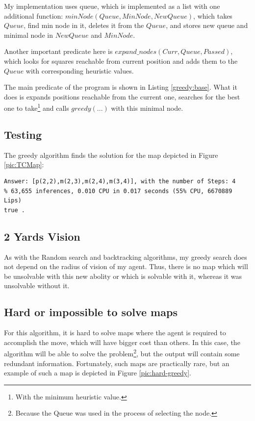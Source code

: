 \documentclass[a4apper,11pt]{article}
\begin{document}
My implementation uses queue, which is implemented as a list with one additional function: $minNode(Queue, MinNode, NewQueue)$, which takes $Queue$, find min node in it, deletes it from the $Queue$, and stores new queue and minimal node in $NewQueue$ and $MinNode$. 

Another important predicate here is $expand\_nodes(Curr, Queue, Passed)$, which looks for squares reachable from current position and adds them to the $Queue$ with corresponding heuristic values.

The main predicate of the program is shown in Listing \ref{greedy:base}. What it does is expands positions reachable from the current one, searches for the best one to take\footnote{With the minimum heuristic value.} and calls $greedy(...)$ with this minimal node.


\subsection{Testing}
The greedy algorithm finds the solution for the map depicted in Figure \ref{pic:TCMap}:
\begin{lstlisting}
Answer: [p(2,2),m(2,3),m(2,4),m(3,4)], with the number of Steps: 4
% 63,655 inferences, 0.010 CPU in 0.017 seconds (55% CPU, 6670889 Lips)
true .
\end{lstlisting}

\subsection{2 Yards Vision}
As with the Random search and backtracking algorithms, my greedy search does not depend on the radius of vision of my agent. Thus, there is no map which will be unsolvable with this new abolity or which is solvable with it, whereas it was unsolvable without it.

\subsection{Hard or impossible to solve maps}
For this algorithm, it is hard to solve maps where the agent is required to accomplish the move, which will have bigger cost than others. In this case, the algorithm will be able to solve the problem\footnote{Because the Queue was used in the process of selecting the node.}, but the output will contain some redundant information. Fortunately, such maps are practically rare, but an example of such a map is depicted in Figure \ref{pic:hard-greedy}.
\end{document}
